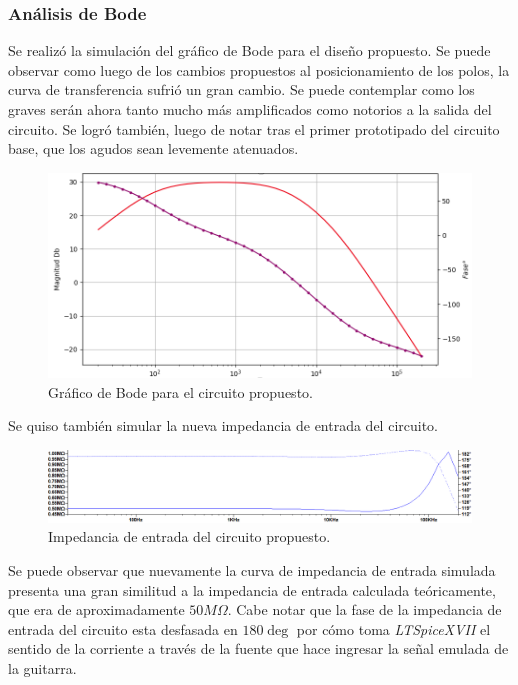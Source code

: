 \subsubsection{Análisis de Bode}
Se realizó la simulación del gráfico de Bode para el diseño propuesto. Se puede observar como luego de los cambios propuestos al posicionamiento de los polos, la curva de transferencia sufrió un gran cambio. Se puede contemplar como los graves serán ahora tanto mucho más amplificados como notorios a la salida del circuito. Se logró también, luego de notar tras el primer prototipado del circuito base, que los agudos sean levemente atenuados. 
\begin{figure}[H]
	\centering
	\includegraphics[width=1\textwidth, trim={0 0 0 0}, clip]{Ejercicio5/Imagenes/Circuito_base/Sim/circuito_propuesto_bode.png}
	\caption{Gráfico de Bode para el circuito propuesto.}
	\label{fig:sim_prop_bode}
\end{figure}

Se quiso también simular la nueva impedancia de entrada del circuito.

\begin{center}
\begin{figure}[H]
	\hspace{-6em}
	\includegraphics[width=1.4\textwidth, trim={0 0 0 0}, clip]{Ejercicio5/Imagenes/Circuito_base/Sim/circuito_propuesto_zin.png}
	\caption{Impedancia de entrada del circuito propuesto.}
	\label{fig:sim_prop_zin}
\end{figure}
\end{center}

Se puede observar que nuevamente la curva de impedancia de entrada simulada presenta una gran similitud a la impedancia de entrada calculada teóricamente, que era de aproximadamente $50M\Omega$. Cabe notar que la fase de la impedancia de entrada del circuito esta desfasada en $180\deg$ por cómo toma \textit{LTSpiceXVII} el sentido de la corriente a través de la fuente que hace ingresar la señal emulada de la guitarra.

